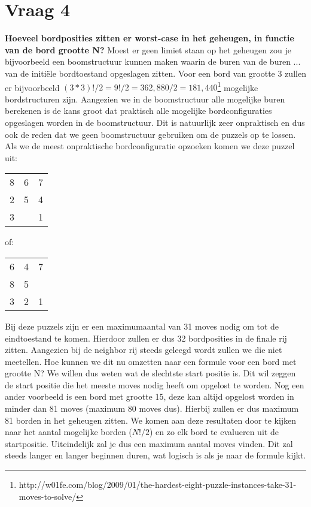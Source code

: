 \documentclass[12pt, letterpaper]{article}
\begin{document}
\section{Vraag 4}
\textbf{Hoeveel bordposities zitten er worst-case in het geheugen, in functie van de bord grootte N?}\newline
Moest er geen limiet staan op het geheugen zou je bijvoorbeeld een boomstructuur kunnen maken waarin de buren van de buren ... van de initiële bordtoestand opgeslagen zitten.
Voor een bord van grootte 3 zullen er bijvoorbeeld $(3*3)! / 2 = 9! / 2 = 362,880 / 2 = 181,440$\footnote{http://w01fe.com/blog/2009/01/the-hardest-eight-puzzle-instances-take-31-moves-to-solve/} mogelijke bordstructuren zijn. Aangezien we in de boomstructuur alle mogelijke buren berekenen is de 
kans groot dat praktisch alle mogelijke bordconfiguraties opgeslagen worden in de boomstructuur. Dit is natuurlijk zeer onpraktisch en dus ook de reden dat we geen boomstructuur
gebruiken om de puzzels op te lossen.\newline
Als we de meest onpraktische bordconfiguratie opzoeken komen we deze puzzel uit:\newline
\begin{tabular}{c c c}
    8 & 6 & 7\\
    2 & 5 & 4\\
    3 &   & 1
\end{tabular}
of:
\begin{tabular}{c c c}
    6 & 4 & 7\\
    8 & 5 &  \\
    3 & 2 & 1
\end{tabular}\newline
Bij deze puzzels zijn er een maximumaantal van 31 moves nodig om tot de eindtoestand te komen. Hierdoor zullen er dus 32 bordposities in de finale rij zitten. Aangezien
bij de neighbor rij steeds geleegd wordt zullen we die niet meetellen. Hoe kunnen we dit nu omzetten naar een formule voor een bord met grootte N? We willen dus weten
wat de slechtste start positie is. Dit wil zeggen de start positie die het meeste moves nodig heeft om opgelost te worden. Nog een ander voorbeeld is een bord met grootte 15,
deze kan altijd opgelost worden in minder dan 81 moves (maximum 80 moves dus). Hierbij zullen er dus maximum 81 borden in het geheugen zitten. We komen aan deze resultaten door
te kijken naar het aantal mogelijke borden ($N! / 2$) en zo elk bord te evalueren uit de startpositie. Uiteindelijk zal je dus een maximum aantal moves vinden. Dit zal steeds langer
en langer beginnen duren, wat logisch is als je naar de formule kijkt.
 
\end{document}

